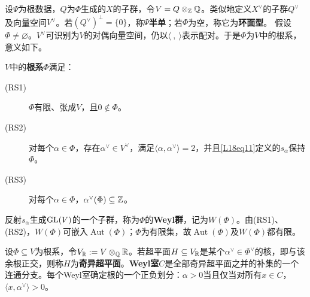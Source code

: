设$\Psi$为根数据，$Q$为$\Phi$生成的$X$的子群，令$V=Q\otimes_{\mathbb{Z}}\mathbb{Q}$。类似地定义$X^\vee$的子群$Q^\vee$及向量空间$V^\vee$。若$(Q^\vee)^\perp=\{0\}$，称$\Psi$\textbf{半单}；若$\Phi$为空，称它为\textbf{环面型}。
假设$\Phi\ne\varnothing$。$V^\vee$可识别为$V$的对偶向量空间，仍以$\langle\ ,\ \rangle$表示配对。于是$\Phi$为$V$中的根系，意义如下。
\begin{definition*}
$V$中的\textbf{根系}$\Phi$满足：
\begin{description}
\item[(RS1)] $\Phi$有限、张成$V$，且$0\notin\Phi$。
\item[(RS2)] 对每个$\alpha\in\Phi$，存在$\alpha^\vee\in V^\vee$，满足$\langle\alpha,\alpha^\vee\rangle=2$，并且\eqref{L18eq11}定义的$s_\alpha$保持$\Phi$。
\item[(RS3)] 对每个$\alpha\in\Phi$，$\alpha^\vee(\Phi)\subseteq\mathbb{Z}$。
\end{description}
\end{definition*}
反射$s_\alpha$生成$\operatorname{GL}(V)$的一个子群，称为$\Phi$的\textbf{Weyl群}，记为$W(\Phi)$。由(RS1)、(RS2)，$W(\Phi)$可嵌入$\operatorname{Aut}(\Phi)$；$\Phi$为有限集，故$\operatorname{Aut}(\Phi)$及$W(\Phi)$都有限。

设$\Phi\subseteq V$为根系，令$V_{\mathbb{R}}:=V\otimes_{\mathbb{Q}}\mathbb{R}$。若超平面$H\subseteq V_{\mathbb{R}}$是某个$\alpha^\vee\in\Phi^\vee$的核，即与该余根正交，则称$H$为\textbf{奇异超平面}。\textbf{Weyl室}$C$是全部奇异超平面之并的补集的一个连通分支。每个Weyl室确定根的一个正负划分：$\alpha>0$当且仅当对所有$x\in C$，$\langle x,\alpha^\vee\rangle>0$。

